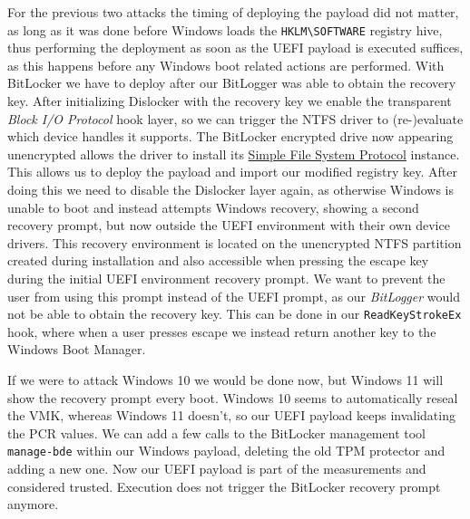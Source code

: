 


For the previous two attacks the timing of deploying the payload did not matter, as long as it was done before Windows loads the \lstinline{HKLM\SOFTWARE} registry hive, thus performing the deployment as soon as the \ac{UEFI} payload is executed suffices, as this happens before any Windows boot related actions are performed.
With BitLocker we have to deploy after our BitLogger was able to obtain the recovery key.
After initializing Dislocker with the recovery key we enable the transparent \emph{Block \ac{I/O} Protocol} hook layer, so we can trigger the \ac{NTFS} driver to (re-)evaluate which device handles it supports.
The BitLocker encrypted drive now appearing unencrypted allows the driver to install its \hyperref[lst:simple-file-system-protocol]{Simple File System Protocol} instance.
This allows us to deploy the payload and import our modified registry key.
After doing this we need to disable the Dislocker layer again, as otherwise Windows is unable to boot and instead attempts Windows recovery, showing a second recovery prompt, but now outside the \ac{UEFI} environment with their own device drivers.
This recovery environment is located on the unencrypted \ac{NTFS} partition created during installation and also accessible when pressing the escape key during the initial \ac{UEFI} environment recovery prompt.
We want to prevent the user from using this prompt instead of the \ac{UEFI} prompt, as our \emph{BitLogger} would not be able to obtain the recovery key.
This can be done in our \lstinline{ReadKeyStrokeEx} hook, where when a user presses escape we instead return another key to the Windows Boot Manager.



If we were to attack Windows 10 we would be done now, but Windows 11 will show the recovery prompt every boot.
Windows 10 seems to automatically reseal the \ac{VMK}, whereas Windows 11 doesn't, so our \ac{UEFI} payload keeps invalidating the \ac{PCR} values.
We can add a few calls to the BitLocker management tool \lstinline{manage-bde} \cite{microsoft-bitlocker-manage-bde} within our Windows payload, deleting the old \ac{TPM} protector and adding a new one.
Now our \ac{UEFI} payload is part of the measurements and considered trusted.
Execution does not trigger the BitLocker recovery prompt anymore.

